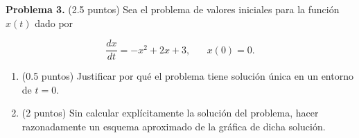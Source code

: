 \textbf{Problema 3.} (2.5 puntos) Sea el problema de valores iniciales para la función $x(t)$ dado por

\begin{equation*}
    \frac{dx}{dt} = -x^2 + 2x+3, \hspace{20pt} x(0) = 0.
\end{equation*}



\begin{enumerate}
[label=(\alph*)]
    \item (0.5 puntos) Justificar por qué el problema tiene solución única en un entorno de $t = 0$.
    \item (2 puntos) Sin calcular explícitamente la solución del problema, hacer razonadamente un
    esquema aproximado de la gráfica de dicha solución.
\end{enumerate}
